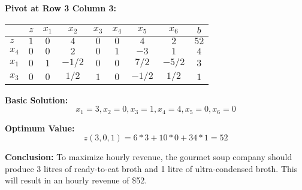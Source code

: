 \documentclass{article}[12pt,a4paper]
\begin{document}
\begin{enumerate}
\begin{enumerate}
   \textbf{Pivot at Row 3 Column 3:}
    \begin{center}
    \begin{tabular}{l | c c c c c c c | c}
             & $z$ & $x_1$ & $x_2$ & $x_3$ & $x_4$ & $x_5$ & $x_6$ & $b$ \\ \hline
   $z$     & $1$ & $0$   & $4$ & $0$  & $0$     & $4$     & $2$     & $52$ \\ \hline
   $x_4$ & $0$ & $0$    & $2$    & $0$      & $1$     & $-3$     & $1$     & $4$ \\
   $x_1$ & $0$ & $1$    & $-1/2$    & $0$      & $0$     & $7/2$     & $-5/2$     & $3$ \\
   $x_3$ & $0$ & $0$    & $1/2$    & $1$      & $0$     & $-1/2$     & $1/2$     & $1$ \\
   \end{tabular}
   \end{center}
   
   \textbf{Basic Solution:}
   $$x_1 = 3, x_2 = 0, x_3 = 1, x_4 = 4, x_5 = 0, x_6 = 0$$
   
   \textbf{Optimum Value:}
   $$z(3,0,1) = 6*3 + 10*0 + 34*1 = 52$$
   
   \textbf{Conclusion:} To maximize hourly revenue, the gourmet soup company should produce 3 litres of ready-to-eat broth
   and 1 litre of ultra-condensed broth. This will result in an hourly revenue of \$52.
   
  \end{enumerate}
  
  \end{enumerate}
\end{document}
